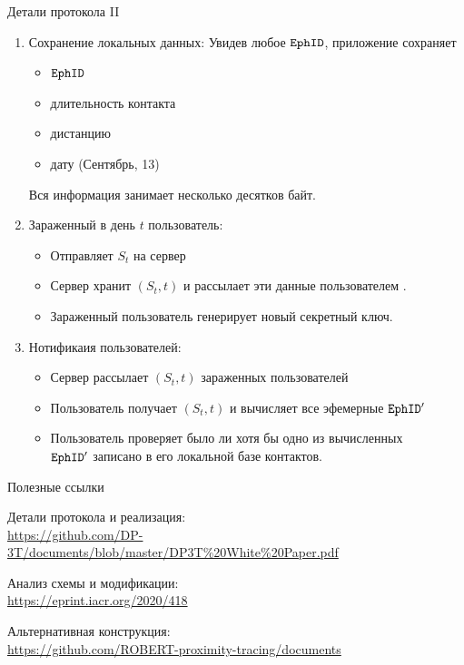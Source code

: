 \documentclass[usenames,dvipsnames,8pt,aspectratio=169]{beamer}
\begin{document}
\begin{frame}{Детали протокола II}
\large
\begin{enumerate}
	\itemsep 1em
	\setcounter{enumi}{2}
	\item {\color{Orange} Сохранение локальных данных:}
	Увидев любое $\mathtt{EphID}$, приложение сохраняет
	\begin{itemize}
		\large
		\item $\mathtt{EphID}$ 
		\item длительность контакта
		\item дистанцию
		\item дату (Сентябрь, 13)
	\end{itemize}

Вся информация занимает несколько десятков байт.

	\item {\color{Orange} Зараженный в день $t$ пользователь:}	
	\begin{itemize}
	\large
	\item Отправляет $S_t$ на сервер
	\item Сервер хранит $(S_t, t)$ и рассылает эти данные пользователем .
	\item Зараженный пользователь генерирует новый секретный ключ.
	\end{itemize}

\item {\color{Orange} Нотификаия пользователей:} 	
	\begin{itemize}
		\large
		\item Сервер рассылает $(S_t,t)$ зараженных пользователей
		\item Пользователь получает $(S_t,t)$  и вычисляет все эфемерные $\mathtt{EphID}'$
		\item Пользователь проверяет было ли хотя бы одно из вычисленных \\ $\mathtt{EphID}'$ записано в его локальной базе контактов.
	\end{itemize}
\end{enumerate}
\end{frame}


\begin{frame}{Полезные ссылки}
\large

Детали протокола и реализация:\\
 \url{https://github.com/DP-3T/documents/blob/master/DP3T\%20White\%20Paper.pdf}
 
 \vspace{20pt}
 
Анализ схемы и модификации:\\
\url{https://eprint.iacr.org/2020/418}

 \vspace{20pt}

Альтернативная конструкция:\\
\url{https://github.com/ROBERT-proximity-tracing/documents}


\end{frame}
\end{document}
